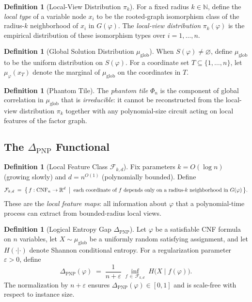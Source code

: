 \documentclass[11pt]{article}
\theoremstyle{definition}
\newtheorem{definition}[theorem]{Definition}
\theoremstyle{remark}
\begin{document}
\begin{definition}[Local-View Distribution $\pi_k$]
\label{def:local-view}
For a fixed radius $k \in \mathbb{N}$, define the \emph{local type}
of a variable node $x_i$ to be the rooted-graph isomorphism class of
the radius-$k$ neighborhood of $x_i$ in $G(\varphi)$.  The
\emph{local-view distribution} $\pi_k(\varphi)$ is the empirical
distribution of these isomorphism types over $i = 1, \ldots, n$.
\end{definition}

\begin{definition}[Global Solution Distribution $\mu_{\mathrm{glob}}$]
\label{def:mu-glob}
When $S(\varphi) \neq \varnothing$, define $\mu_{\mathrm{glob}}$ to be
the uniform distribution on $S(\varphi)$.  For a coordinate set
$T \subseteq \{1, \ldots, n\}$, let $\mu_\varphi(x_T)$ denote the
marginal of $\mu_{\mathrm{glob}}$ on the coordinates in $T$.
\end{definition}

\begin{definition}[Phantom Tile]
\label{def:phantom-tile}
The \emph{phantom tile} $\Phi_n$ is the component of global correlation
in $\mu_{\mathrm{glob}}$ that is \emph{irreducible}: it cannot be
reconstructed from the local-view distribution $\pi_k$ together with
any polynomial-size circuit acting on local features of the factor graph.
\end{definition}

\subsection{The $\Delta_{\mathrm{PNP}}$ Functional}

\begin{definition}[Local Feature Class $\mathcal{F}_{k,d}$]
\label{def:feature-class}
Fix parameters $k = O(\log n)$ (growing slowly) and
$d = n^{O(1)}$ (polynomially bounded).  Define
\[
  \mathcal{F}_{k,d} \;=\; \bigl\{\, f : \mathrm{CNF}_n \to \mathbb{R}^d
    \;\bigm|\;
    \text{each coordinate of } f \text{ depends only on a radius-}k
    \text{ neighborhood in } G(\varphi) \,\bigr\}.
\]
These are the \emph{local feature maps}: all information about $\varphi$
that a polynomial-time process can extract from bounded-radius local
views.
\end{definition}

\begin{definition}[Logical Entropy Gap $\Delta_{\mathrm{PNP}}$]
\label{def:delta-pnp}
Let $\varphi$ be a satisfiable CNF formula on $n$ variables, let
$X \sim \mu_{\mathrm{glob}}$ be a uniformly random satisfying
assignment, and let $H(\cdot | \cdot)$ denote Shannon conditional
entropy.  For a regularization parameter $\varepsilon > 0$, define
\[
  \boxed{\;
    \Delta_{\mathrm{PNP}}(\varphi)
    \;=\;
    \frac{1}{n + \varepsilon}
    \;\inf_{f \,\in\, \mathcal{F}_{k,d}}\;
    H\!\bigl(X \;\big|\; f(\varphi)\bigr).
  \;}
\]
The normalization by $n + \varepsilon$ ensures
$\Delta_{\mathrm{PNP}}(\varphi) \in [0,1]$ and is scale-free with
respect to instance size.
\end{definition}
\end{document}
